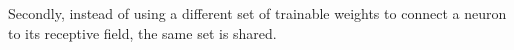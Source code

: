 Secondly, instead of using a different set of trainable weights to connect a neuron to its receptive field, the same set is shared.





